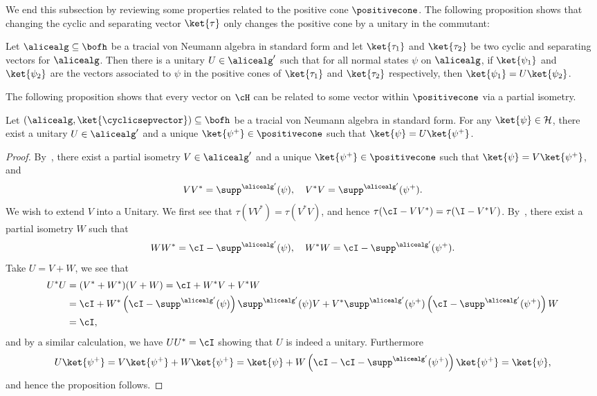 We end this subsection by reviewing some properties related to the positive cone $\positivecone$. The following proposition shows that changing the cyclic and separating vector $\ket{\tau}$ only changes the positive cone by a unitary in the commutant:
\begin{proposition} \label{prop:positive_cone_unitary}
	Let $\alicealg \subseteq \bofh$ be a tracial von Neumann algebra in standard form and let $\ket{\tau_1}$ and $\ket{\tau_2}$ be two cyclic and separating vectors for $\alicealg$. Then there is a unitary $U \in \alicealg'$ such that for all normal states 
	$\psi$ on $\alicealg$, if $\ket{\psi_1}$ and $\ket{\psi_2}$ are the vectors associated to $\psi$ in the positive cones of $\ket{\tau_1}$ and $\ket{\tau_2}$ respectively, then $\ket{\psi_1} = U \ket{\psi_2}$.
\end{proposition}
The following proposition shows that every vector on $\cH$ can be related to some vector within $\positivecone$ via a partial isometry. 
\begin{proposition}\label{prop:positive_cone_polar_decomposition}
	Let $(\alicealg, \ket{\cyclicsepvector}) \subseteq \bofh$ be a tracial von Neumann algebra in standard form. For any $\ket{\psi} \in \cal{H}$, there exist a unitary $U \in \alicealg'$ and a unique $\ket{\psi^{+}} \in \positivecone$ such that $\ket{\psi} = U \ket{\psi^{+}}$.
\end{proposition}
\begin{proof}
	By~\cite[Theorem 7 part 5]{arakiPropertiesModularConjugation1974b}, there exist a partial isometry $V \in \alicealg'$ and a unique $\ket{\psi^{+}} \in \positivecone$ such that $\ket{\psi} = V \ket{\psi^{+}}$, and
	\begin{equation*}
		VV^* = \supp^{\alicealg'}(\psi), \quad V^{*}V = \supp^{\alicealg'}(\psi^{+}).
	\end{equation*}
	We wish to extend $V$ into a Unitary. We first see that $\tau(VV^*) = \tau(V^*V)$, and hence $\tau(\cI - VV^*) = \tau(\I - V^*V)$. By~, there exist a partial isometry $W$ such that 
	\begin{equation*}
		WW^* = \cI - \supp^{\alicealg'}(\psi), \quad W^{*}W =  \cI - \supp^{\alicealg'}(\psi^{+}).
	\end{equation*}	
	Take $U = V + W$, we see that
	\begin{align*}
		U^* U &= (V^* + W^*)(V + W) =  \cI  + W^*V + V^* W \\
		&= \cI  + W^*  \left(\cI - \supp^{\alicealg'}(\psi) \right)\supp^{\alicealg'}(\psi)  V + V^*  \supp^{\alicealg'}(\psi^{+}) \left(\cI - \supp^{\alicealg'}(\psi^{+}) \right)  W \\
		&= \cI,
	\end{align*}
	and by a similar calculation, we have $U U^* = \cI$ showing that $U$ is indeed a unitary. Furthermore
	\begin{equation*}
		U \ket{\psi^{+}} = V \ket{\psi^{+}} + W \ket{\psi^{+}} = \ket{\psi}  + W\left( \cI- \cI - \supp^{\alicealg'}(\psi^{+}) \right) \ket{\psi^{+}} = \ket{\psi},
	\end{equation*}
	and hence the proposition follows. 
\end{proof}

